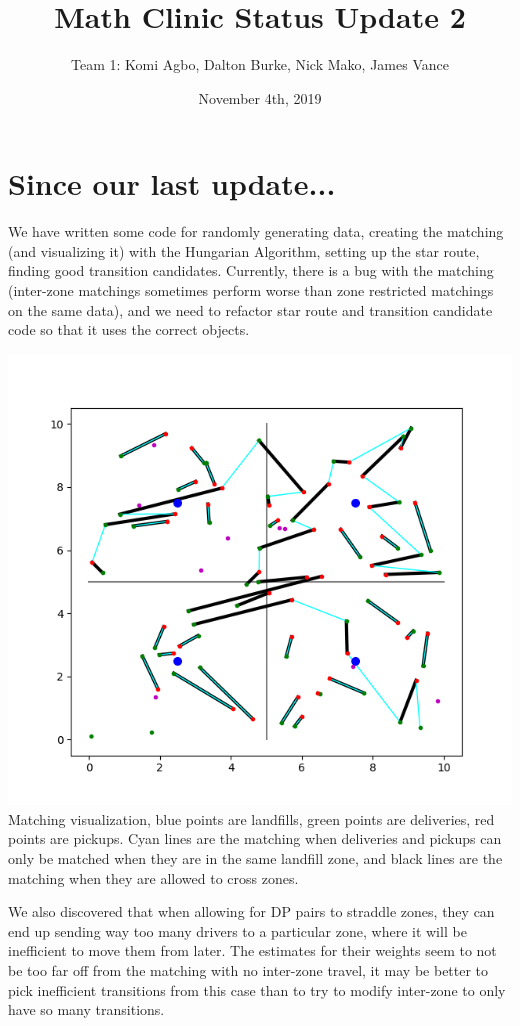 \documentclass{article}
\title{Math Clinic Status Update 2}
\author{Team 1: Komi Agbo, Dalton Burke, Nick Mako, James Vance}
\date{November 4th, 2019}
\begin{document}
\maketitle

\section{Since our last update...}
We have written some code for randomly generating data, creating the matching 
(and visualizing it) with the Hungarian Algorithm, setting up the star route, 
finding good transition candidates. Currently, there is a bug with the matching
(inter-zone matchings sometimes perform worse than zone restricted matchings on
the same data), and we need to refactor star route and transition candidate code
so that it uses the correct objects.

\begin{center}
	\includegraphics[scale=.75]{img/matching_demo.png}\\
	Matching visualization, blue points are landfills, green points are deliveries,
	red points are 	pickups. Cyan lines are the matching when deliveries and pickups
	can only be matched when they are in the same landfill zone, and black lines are 
	the matching when they are allowed to cross zones.
\end{center}

We also discovered that when allowing for DP pairs to straddle zones, they can end up
sending way too many drivers to a particular zone, where it will be inefficient to move 
them from later. The estimates for their weights seem to not be too far off from the 
matching with no inter-zone travel, it may be better to pick inefficient transitions 
from this case than to try to modify inter-zone to only have so many transitions.
\end{document}

